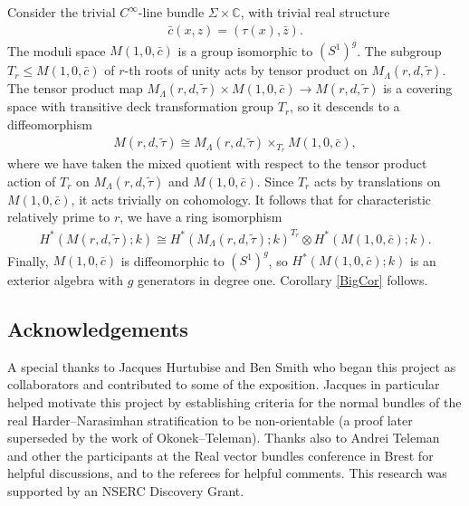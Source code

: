 \documentclass[10pt,a4paper]{amsart}
\numberwithin{equation}{section}
\begin{document}
Consider the trivial $C^{\infty}$-line bundle $\Sigma \times {\mathbb C}$, with trivial real structure \begin{gather*}\bar{c}(x,z) = (\tau(x),\bar{z}).\end{gather*}
The moduli space $M(1,0,\bar{c})$ is a group isomorphic to $(S^1)^g$. The subgroup $T_r \leq M(1,0,\bar{c})$ of $r$-th roots of unity acts by tensor product on $M_{\Lambda}(r,d,\tilde{\tau})$. The tensor product map $ M_{\Lambda}(r,d,\tilde{\tau}) \times M(1,0, \bar{c}) \rightarrow M(r,d,\tilde{\tau})$ is a covering space with transitive deck transformation group $T_r$, so it descends to a dif\/feomorphism
\begin{gather*} M(r,d,\tilde{\tau}) \cong M_{\Lambda}(r,d,\tilde{\tau}) \times_{T_r} M(1,0, \bar{c}),\end{gather*}
where we have taken the mixed quotient with respect to the tensor product action of $T_r$ on $M_{\Lambda}(r,d,\tilde{\tau})$ and $M(1,0, \bar{c})$. Since $T_r$ acts by translations on $M(1,0, \bar{c})$, it acts trivially on cohomology. It follows that for characteristic relatively prime to $r$, we have a ring isomorphism
	\begin{gather*} H^*(M(r,d,\tilde{\tau});k) \cong H^*(M_{\Lambda}(r,d,\tilde{\tau});k)^{T_r} \otimes H^*(M(1,0, \bar{c});k ). \end{gather*}
	Finally, $M(1,0, \bar{c})$ is dif\/feomorphic to $(S^1)^g$, so $H^*(M(1,0, \bar{c});k )$ is an exterior algebra with $g$ generators in degree one. Corollary \ref{BigCor} follows.


\subsection*{Acknowledgements}
A special thanks to Jacques Hurtubise and Ben Smith who began this project as collaborators and contributed to some of the exposition. Jacques in particular helped motivate this project by establishing criteria for the normal bundles of the real Harder--Narasimhan stratif\/ication to be non-orientable (a proof later superseded by the work of Okonek--Teleman). Thanks also to Andrei Teleman and other the participants at the Real vector bundles conference in Brest for helpful discussions, and to the referees for helpful comments. This research was supported by an NSERC Discovery Grant.

\end{document}
